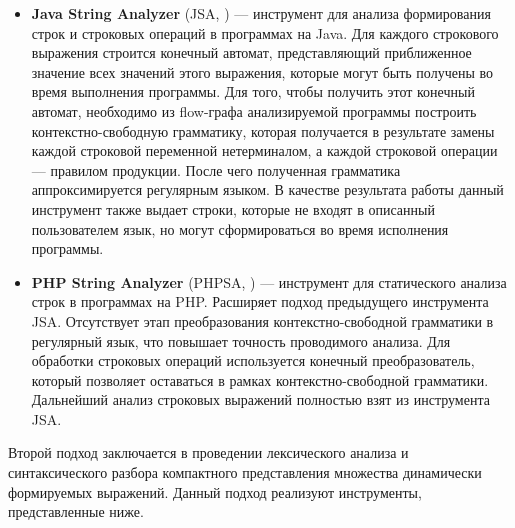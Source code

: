\documentclass{matmex-diploma}
\begin{document}
\begin{itemize}
\item \textbf{Java String Analyzer} (JSA, \cite{JSA, JSAUrl}) {---}  инструмент для анализа формирования строк и строковых операций в программах на Java. Для каждого строкового выражения строится конечный автомат, представляющий приближенное значение всех значений этого выражения, которые могут быть получены во время выполнения программы. Для того, чтобы получить этот конечный автомат, необходимо из flow-графа анализируемой программы построить контекстно-свободную грамматику, которая получается в результате замены каждой строковой переменной нетерминалом, а каждой строковой операции {---} правилом продукции. После чего полученная грамматика аппроксимируется регулярным языком. В качестве результата работы данный инструмент также выдает строки, которые не входят в описанный пользователем язык, но могут сформироваться во время исполнения программы. 

\item \textbf{PHP String Analyzer} (PHPSA, \cite{PHPSA, PHPSAUrl}) {---} инструмент для статического анализа строк в программах на PHP. Расширяет подход предыдущего инструмента JSA. Отсутствует этап преобразования контекстно-свободной грамматики в регулярный язык, что повышает точность проводимого анализа. Для обработки строковых операций используется конечный преобразователь, который позволяет оставаться в рамках контекстно-свободной грамматики. Дальнейший анализ строковых выражений полностью взят из инструмента JSA.
\end{itemize} 

Второй подход заключается в проведении лексического анализа и синтаксического разбора компактного представления множества динамически формируемых выражений. Данный подход реализуют инструменты, представленные ниже.
\end{document}
